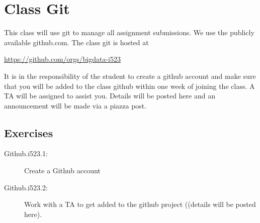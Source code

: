 \FILENAME

\section{Class Git}\label{class-git}

This class will use git to manage all assignment submissions. We use the
publicly available github.com. The class git is hosted at

\url{https://github.com/orgs/bigdata-i523}

It is in the responsibility of the student to create a github account
and make sure that you will be added to the class github within one week
of joining the class. A TA will be assigned to assist you. Details will
be posted here and an announcement will be made via a piazza post.

\subsection{Exercises}\label{exercises}

\begin{description}
\item[Github.i523.1:]
Create a Github account
\item[Github.i523.2:]
Work with a TA to get added to the github project ((details will be
posted here).
\end{description}
